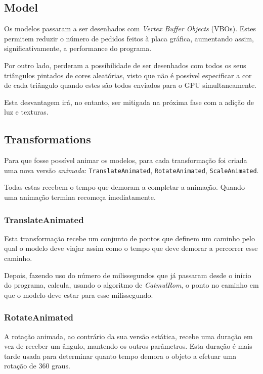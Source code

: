 \documentclass[a4paper]{article}
\begin{document}
\subsection{Model}

Os modelos passaram a ser desenhados com \textit{Vertex Buffer Objects} (VBOs). Estes permitem reduzir o número de pedidos feitos à placa gráfica, aumentando assim, significativamente, a performance do programa.

Por outro lado, perderam a possibilidade de ser desenhados com todos os seus triângulos pintados de cores aleatórias, visto que não é possível especificar a cor de cada triângulo quando estes são todos enviados para o GPU simultaneamente.

Esta desvantagem irá, no entanto, ser mitigada na próxima fase com a adição de luz e texturas.

\subsection{Transformations}

Para que fosse possível animar os modelos, para cada transformação foi criada uma nova versão \textit{animada}: \texttt{TranslateAnimated}, \texttt{RotateAnimated}, \texttt{ScaleAnimated}.

Todas estas recebem o tempo que demoram a completar a animação. Quando uma animação termina recomeça imediatamente.

\subsubsection{TranslateAnimated}

Esta transformação recebe um conjunto de pontos que definem um caminho pelo qual o modelo deve viajar assim como o tempo que deve demorar a percorrer esse caminho.

Depois, fazendo uso do número de milissegundos que já passaram desde o início do programa, calcula, usando o algoritmo de \textit{CatmulRom}, o ponto no caminho em que o modelo deve estar para esse milissegundo.

\subsubsection{RotateAnimated}

A rotação animada, ao contrário da sua versão estática, recebe uma duração em vez de receber um ângulo, mantendo os outros parâmetros. Esta duração é mais tarde usada para determinar quanto tempo demora o objeto a efetuar uma rotação de 360\degree{} graus.
\end{document}
